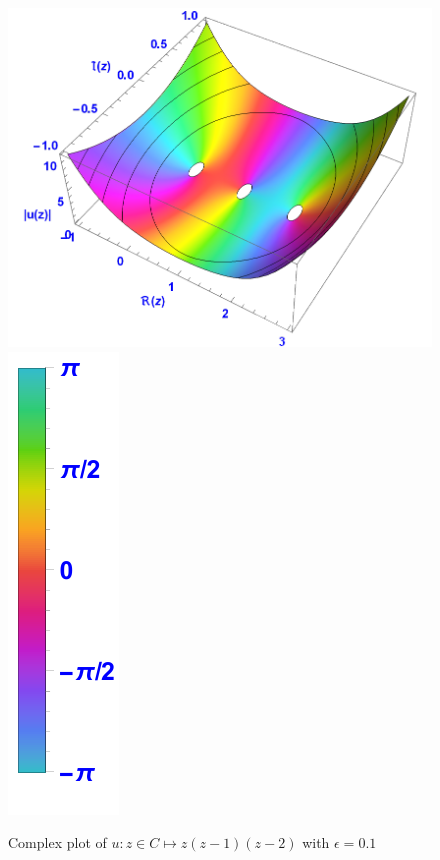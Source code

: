 \documentclass[]{article}
\theoremstyle{remark}
\begin{document}
\begin{figure}
	\centering
	\includegraphics[height=0.4\linewidth]{"complex plot"}
	\includegraphics[height=0.4\linewidth]{"complex plot_legend"}
	\caption{Complex plot of $u: z\in C \mapsto z(z-1)(z-2) $ with $ \epsilon = 0.1 $}
	\label{fig:complex-plot}
\end{figure}
\end{document}
